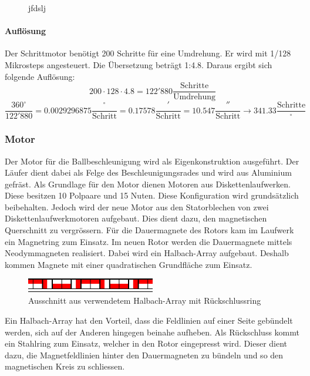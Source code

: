 \begin{figure}[h!]          
	\centering             
	\caption{jfdslj}
	\label{fig:hhjfdhfd}        
\end{figure}

\paragraph{Auflösung}
Der Schrittmotor benötigt 200 Schritte für eine Umdrehung. Er wird mit 1/128 
Mikrosteps angesteuert. Die Übersetzung beträgt 1:4.8. Daraus ergibt sich 
folgende Auflösung: 
\[ 200 \cdot 128 \cdot 4.8 = 122'880 \frac{\text{Schritte}}{\text{Umdrehung}}  \]
\[ \frac{360^\circ}{122'880} = 0.0029296875 \frac{^\circ}{\text{Schritt}} 
= 0.17578 \frac{'}{\text{Schritt}} = 10.547 \frac{''}{\text{Schritt}}
\rightarrow 341.33 \frac{\text{Schritte}}{^\circ}\]

\subsubsection{Motor}
Der Motor für die Ballbeschleunigung wird als Eigenkonstruktion ausgeführt.  
Der Läufer dient dabei als Felge des Beschleunigungsrades und wird aus 
Aluminium gefräst. Als Grundlage für den Motor dienen Motoren aus 
Diskettenlaufwerken. Diese besitzen 10 Polpaare und 15 Nuten. Diese 
Konfiguration wird grundsätzlich beibehalten. Jedoch wird der neue Motor aus 
den Statorblechen von zwei Diskettenlaufwerkmotoren aufgebaut. Dies dient 
dazu, den magnetischen Querschnitt zu vergrössern. Für die Dauermagnete des 
Rotors kam im Laufwerk ein Magnetring zum Einsatz. Im neuen Rotor werden die 
Dauermagnete mittels Neodymmagneten realisiert. Dabei wird ein Halbach-Array 
aufgebaut. Deshalb kommen Magnete mit einer quadratischen Grundfläche zum 
Einsatz. 
\begin{figure}[h!]
    \centering
    \includegraphics[width=0.5\textwidth]{fig/halbach.pdf}
    \caption{Ausschnitt aus verwendetem Halbach-Array mit Rückschlussring}
    \label{fig:halbach}
\end{figure}
Ein Halbach-Array hat den Vorteil, dass die Feldlinien auf einer 
Seite gebündelt werden, sich auf der Anderen hingegen beinahe aufheben. 
Als Rückschluss kommt ein Stahlring zum Einsatz, welcher in den Rotor 
eingepresst wird. Dieser dient dazu, die Magnetfeldlinien hinter den 
Dauermagneten zu bündeln und so den magnetischen Kreis zu schliessen. 

